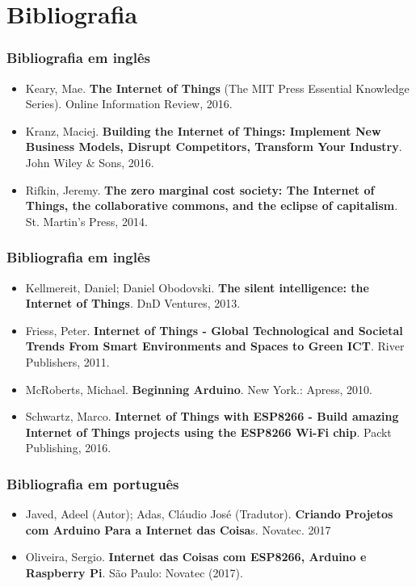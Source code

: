 \documentclass{beamer}
\begin{document}
\section{Bibliografia}

\begin{frame}
\frametitle{Bibliografia em inglês}
\begin{itemize}
	\item Keary, Mae. \textbf{The Internet of Things} (The MIT Press Essential Knowledge Series). Online Information Review, 2016.
	
	\item Kranz, Maciej. \textbf{Building the Internet of Things: Implement New Business Models, Disrupt Competitors, Transform Your Industry}. John Wiley \& Sons, 2016.
	
	\item Rifkin, Jeremy. \textbf{The zero marginal cost society: The Internet of Things, the collaborative commons, and the eclipse of capitalism}. St. Martin's Press, 2014.
\end{itemize}
\end{frame}

\begin{frame}
\frametitle{Bibliografia em inglês}
\begin{itemize}
\item Kellmereit, Daniel; Daniel Obodovski. \textbf{The silent intelligence: the Internet of Things}. DnD Ventures, 2013.

\item Friess, Peter. \textbf{Internet of Things - Global Technological and Societal Trends From Smart Environments and Spaces to Green ICT}. River Publishers, 2011.

\item McRoberts, Michael. \textbf{Beginning Arduino}. New York.: Apress, 2010.

\item Schwartz, Marco. \textbf{Internet of Things with ESP8266 - Build amazing Internet of Things projects using the ESP8266 Wi-Fi chip}. Packt Publishing, 2016.

\end{itemize}
\end{frame}

\begin{frame}
\frametitle{Bibliografia em português}
	\begin{itemize}		
		\item Javed, Adeel (Autor); Adas, Cláudio José (Tradutor). \textbf{Criando Projetos com Arduino Para a Internet das Coisa}s. Novatec. 2017
		
		\item Oliveira, Sergio. \textbf{Internet das Coisas com ESP8266, Arduino e Raspberry Pi}. São Paulo: Novatec (2017).
	\end{itemize}
\end{frame}
\end{document}
